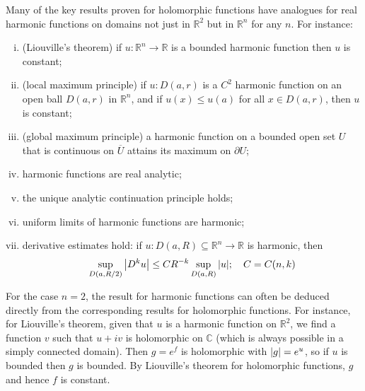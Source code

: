 \begin{remark}
	Many of the key results proven for holomorphic functions have analogues for real harmonic functions on domains not just in \( \mathbb R^2 \) but in \( \mathbb R^n \) for any \( n \).
	For instance:
	\begin{enumerate}[(i)]
		\item (Liouville's theorem) if \( u \colon \mathbb R^n \to \mathbb R \) is a bounded harmonic function then \( u \) is constant;
		\item (local maximum principle) if \( u \colon D(a,r) \) is a \( C^2 \) harmonic function on an open ball \( D(a,r) \) in \( \mathbb R^n \), and if \( u(x) \leq u(a) \) for all \( x \in D(a,r) \), then \( u \) is constant;
		\item (global maximum principle) a harmonic function on a bounded open set \( U \) that is continuous on \( \overline U \) attains its maximum on \( \partial U \);
		\item harmonic functions are real analytic;
		\item the unique analytic continuation principle holds;
		\item uniform limits of harmonic functions are harmonic;
		\item derivative estimates hold: if \( u \colon D(a,R) \subseteq \mathbb R^n \to \mathbb R \) is harmonic, then
		\[ \sup_{D(a,R/2)} \abs{D^k u} \leq CR^{-k} \sup_{D(a,R)} \abs{u};\quad C = C(n,k) \]
	\end{enumerate}
	For the case \( n = 2 \), the result for harmonic functions can often be deduced directly from the corresponding results for holomorphic functions.
	For instance, for Liouville's theorem, given that \( u \) is a harmonic function on \( \mathbb R^2 \), we find a function \( v \) such that \( u + iv \) is holomorphic on \( \mathbb C \) (which is always possible in a simply connected domain).
	Then \( g = e^f \) is holomorphic with \( \abs{g} = e^u \), so if \( u \) is bounded then \( g \) is bounded.
	By Liouville's theorem for holomorphic functions, \( g \) and hence \( f \) is constant.
\end{remark}
